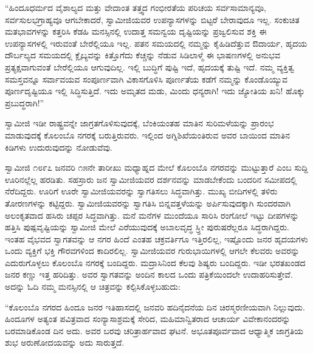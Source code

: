  “ಹಿಂದೂಧರ್ಮದ ವೈಶಾಲ್ಯದ ಮತ್ತು ವೇದಾಂತ ತತ್ತ್ವದ ಗಂಭೀರತೆಯ ಪರಿಚಯ ಸರ್ವಸಾಮಾನ್ಯವೂ, ಸರ್ವಸುಲಭಗ್ರಾಹ್ಯವೂ ಆಗಬೇಕಾದರೆ, ಸ್ವಾಮೀಜಿಯವರ ಉಪನ್ಯಾಸಗಳನ್ನು ಬಿಟ್ಟರೆ ಬೇರಾವುದೂ ಇಲ್ಲ. ಸಂಕುಚಿತ ಮತಭಾವಗಳನ್ನು ಕತ್ತರಿಸಿ ಕೆಡಹಿ ಮನಸ್ಸಿನಲ್ಲಿ ಉದಾತ್ತ ಸಮನ್ವಯ ದೃಷ್ಟಿಯನ್ನು ಪ್ರಜ್ವಲಿಸುವ ಶಕ್ತಿ ಈ ಉಪನ್ಯಾಸಗಳಲ್ಲಿ ಇರುವಂತೆ ಬೇರೆಲ್ಲಿಯೂ ಇಲ್ಲ. ಪತನ ಸಮಯದಲ್ಲಿ ನಮ್ಮನ್ನು ಕೈಹಿಡಿದೆತ್ತುವ ಔದಾರ್ಯ, ಹೃದಯ ದೌರ್ಬಲ್ಯದ ಸಮಯದಲ್ಲಿ ಕ್ಲೈಬ್ಯವನ್ನು ಕಿತ್ತೊಗೆದು ಕೆಚ್ಚನ್ನು ನೆಡುವ ಸಿಡಿಲಾಳ್ಮೆ ಈ ಭಾಷಣಗಳಲ್ಲಿ ಅನುಭವ ಪ್ರತ್ಯಕ್ಷವಾಗುವಂತೆ ಬೇರೆಲ್ಲಿಯೂ ಆಗುವುದಿಲ್ಲ. ಇಲ್ಲಿ ಬುದ್ಧಿಗೆ ಪುಷ್ಟಿ ಇದೆ, ಹೃದಯಕ್ಕೆ ತುಷ್ಟಿ ಇದೆ. ನಮ್ಮ ವ್ಯಕ್ತಿತ್ವ ಸಮಸ್ತವನ್ನೂ ಸರ್ವಾವಯವ ಸಂಪೂರ್ಣವಾಗಿ ವಿಕಾಸಗೊಳಿಸಿ ಪೂರ್ಣತೆಯ ಕಡೆಗೆ ನಮ್ಮನ್ನು ಕೊಂಡೊಯ್ಯುವ ಪೂರ್ಣದೃಷ್ಟಿಯೂ ಇಲ್ಲಿ ಸಿದ್ಧಿಸುತ್ತಿದೆ. ಇದು ಅಮೃತದ ಮಡು, ಮಿಂದು ಧನ್ಯರಾಗಿ! ಇದು ಜ್ಯೋತಿಯ ಖನಿ! ಹೊಕ್ಕು ಪ್ರಬುದ್ಧರಾಗಿ!” 

 ಸ್ವಾಮೀಜಿ ಇಡೀ ರಾಷ್ಟ್ರವನ್ನೇ ಜಾಗ್ರತಗೊಳಿಸುವುದಕ್ಕೆ, ಬೆಂಕಿಯಂತಹ ಮಾತಿನ ಸುರಿಮಳೆಯನ್ನು ಪ್ರಾರಂಭ ಮಾಡುವುದಕ್ಕೆ ಕೊಲಂಬೊ ನಗರಕ್ಕೆ ಬರುತ್ತಿರುವರು. ಇಲ್ಲಿಂದ ಅಗ್ನಿಶಿಖೆಯಂತಿರುವ ಅವರ ಬಾಯಿಂದ ಮಾತಿನ ಕಿಡಿಗಳು ಉದುರುವುದನ್ನು ನೋಡುವೆವು. 

 ಸ್ವಾಮೀಜಿ ೧೮೯೭ ಜನವರಿ ೧೫ನೇ ತಾರೀಖು ಮಧ್ಯಾಹ್ನದ ಮೇಲೆ ಕೊಲಂಬೊ ನಗರವನ್ನು ಮುಟ್ಟುತ್ತಾರೆ ಎಂಬ ಸುದ್ದಿ ಊರಿನಲ್ಲೆಲ್ಲ ಹರಡಿತು. ಸಹಸ್ರಾರು ಜನ ಸ್ವಾಮೀಜಿಯವರ ದರ್ಶನವನ್ನು ಮಾಡಬೇಕೆಂದು ಬಂದರಿನ ಸಮೀಪದಲ್ಲಿ ನೆರೆದಿದ್ದರು. ಊರಿಗೆ ಊರೇ ಸ್ವಾಮೀಜಿಯವರನ್ನು ಸ್ವಾಗತಿಸಲು ಸಿದ್ಧವಾಗಿತ್ತು. ಮುಖ್ಯ ಬೀದಿಗಳಲ್ಲಿ ತಳಿರು ತೋರಣಗಳನ್ನು ಕಟ್ಟಿದ್ದರು. ಸ್ವಾಮೀಜಿಯವರನ್ನು ಸ್ವಾಗತಿಸಿ ಬಿನ್ನವತ್ತಳೆಯನ್ನು ಅರ್ಪಿಸುವುದಕ್ಕಾಗಿ ಸುಂದರವಾಗಿ ಅಲಂಕೃತವಾದ ಹಸಿರು ಚಪ್ಪರ ಸಿದ್ಧವಾಗಿತ್ತು. ಮನೆ ಮನೆಗಳ ಮುಂದೆಯೂ ಸಾರಿಸಿ ರಂಗೋಲೆ ಇಟ್ಟು ದೀಪಗಳನ್ನು ಹತ್ತಿಸಿ ಪುಷ್ಪವೃಷ್ಟಿಯನ್ನು ಸ್ವಾಮೀಜಿ ಮೇಲೆ ಎರೆಯುವುದಕ್ಕೆ ಅಬಾಲವೃದ್ಧ ಸ್ರ್ತೀ ಪುರುಷರೆಲ್ಲರೂ ಸಿದ್ಧರಾಗಿದ್ದರು. ಇಂತಹ ವೈಭವದ ಸ್ವಾಗತವನ್ನು ಆ ನಗರ ಹಿಂದೆ ಎಂತಹ ಚಕ್ರವರ್ತಿಗೂ ಇತ್ತಿರಲಿಲ್ಲ, ಇಷ್ಟೊಂದು ಜನರ ಹೃದಯಗಳು ಒಂದು ವ್ಯಕ್ತಿಗೆ ಭಕ್ತಿ ಗೌರವಗಳಿಂದ ಕಾದಿರಲಿಲ್ಲ. ಸ್ವಾಮೀಜಿಯವರ ಗುರುಭಾಯಿಗಳಲ್ಲಿ ಆಗಲೇ ಕೆಲವರು ಅವರನ್ನು ಎದುರುಗೊಳ್ಳಲು ಕೊಲಂಬೊ ನಗರಕ್ಕೆ ಬಂದಿದ್ದರು. ಮದ್ರಾಸಿನಿಂದ ಕೆಲವು ಶಿಷ್ಯರು ಬಂದಿದ್ದರು. ಇಡೀ ಭರತಖಂಡದ ಜನರ ಕಣ್ಣು ಇತ್ತ ಹರಿದಿತ್ತು. ಅವರ ಸ್ವಾಗತವನ್ನು ಅಂದಿನ ಕಾಲದ ಒಂದು ಪತ್ರಿಕೆಯಿಂದಲೇ ಉದಾಹರಿಸುತ್ತೇವೆ. ಅದನ್ನು ಓದಿ ನಮ್ಮ ಮನಸ್ಸಿನಲ್ಲಿ ಆ ಚಿತ್ರವನ್ನು ಕಲ್ಪಿಸಿಕೊಳ್ಳಬಹುದು: 

 “ಕೊಲಂಬೊ ನಗರದ ಹಿಂದೂ ಜನರ ಇತಿಹಾಸದಲ್ಲಿ ಜನವರಿ ಹದಿನೈದನೆಯ ದಿನ ಚಿರಸ್ಮರಣೀಯವಾಗಿ ನಿಲ್ಲುವುದು. ಹಿಂದೂಗಳ ಅತ್ಯಂತ ಪವಿತ್ರವಾದ ಸಂನ್ಯಾಸಾಶ್ರಮಕ್ಕೆ ಸೇರಿದ, ಮಹಿಮಾನ್ವಿತರಾದ ಆಚಾರ್ಯ ವಿವೇಕಾನಂದರನ್ನು ಬರಮಾಡಿಕೊಂಡ ದಿನ ಅದು. ಅವರ ಬರವು ಚರಿತ್ರಾರ್ಹವಾದ ಘಟನೆ. ಅಭೂತಪೂರ್ವವಾದ ಆಧ್ಯಾತ್ಮಿಕ ಜಾಗ್ರತಿಯ ಶುಭ ಅರುಣೋದಯವನ್ನು ಅದು ಸಾರುತ್ತದೆ. 

